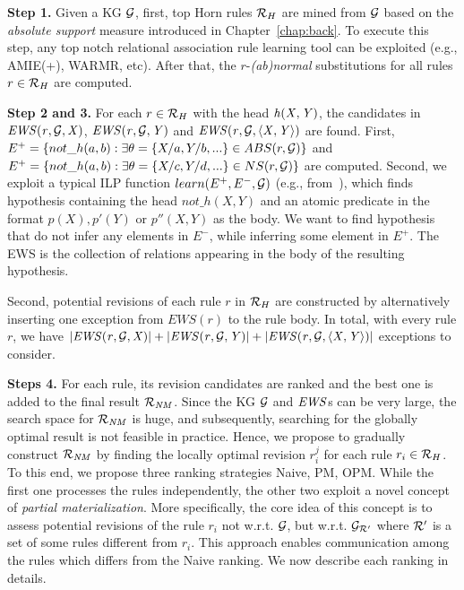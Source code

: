 \noindent \textbf{Step 1.} Given a KG $\mathcal{G}$, first, top Horn rules $\mathcal{R}_H$ are mined from $\mathcal{G}$ based on the \textit{absolute support} measure introduced in Chapter~\ref{chap:back}. To execute this step, any top notch relational association rule learning tool can be exploited (e.g., AMIE(+), WARMR, etc). After that, the $r$-\emph{(ab)normal} substitutions for all rules $r\in \mathcal{R}_H$ are computed.
\smallskip


\noindent \textbf{Step 2 and 3.} For each $r \in \mathcal{R}_H$ with the head $\mathit{h(X,Y)}$, the candidates in $\mathit{EWS(r,\mathcal{G},X)}$, $\mathit{EWS(r,\mathcal{G},Y)}$ and $\mathit{EWS(r,\mathcal{G},\langle X,Y\rangle)}$ are found. First, $E^+ = \{not\_h(a, b): \exists \theta = \{X/a, Y/b, ... \} \in ABS(r, \mathcal{G})\}$ and $E^+ = \{not\_h(a, b): \exists \theta = \{X/c, Y/d, ... \} \in NS(r, \mathcal{G})\}$ are computed. Second, we exploit a typical ILP function $learn(E^+, E^-, \mathcal{G})$ (e.g., from~\cite{ref55}), which finds hypothesis containing the head $not\_h(X, Y)$ and an atomic predicate in the format $p(X), p'(Y)$ or $p''(X, Y)$ as the body. We want to find hypothesis that do not infer any elements in $E^-$, while inferring some element in $E^+$. The EWS is the collection of relations appearing in the body of the resulting hypothesis.

Second, potential revisions of each rule $r$ in $\mathcal{R}_H$ are constructed by alternatively inserting one exception from $EWS(r)$ to the rule body. In total, with every rule $r$, we have $|\mathit{EWS(r,\mathcal{G},X)}|+|\mathit{EWS(r,\mathcal{G},Y)}|+|\mathit{EWS(r,\mathcal{G},\langle X,Y\rangle)}|$ exceptions to consider.

\smallskip

\noindent \textbf{Steps 4.} For each rule, its revision candidates are ranked and the best one is added to the final result $\mathcal{R}_{\mathit{NM}}$. Since the KG $\mathcal{G}$ and $\mathit{EWS}$s can be very large, the search space for $\mathcal{R}_{\mathit{NM}}$ is huge, and subsequently, searching for the globally optimal result is not feasible in practice. Hence, we propose to gradually construct $\mathcal{R}_{\mathit{NM}}$ by finding the locally optimal revision $r_i^{j}$ for each rule $r_i \in \mathcal{R}_{H}$. To this end, we propose three ranking strategies Naive, PM, OPM. While the first one processes the rules independently, the other two exploit a novel concept of \emph{partial materialization}. More specifically, the core idea of this concept is to assess potential revisions of the rule $r_i$ not w.r.t. $\mathcal{G}$, but w.r.t. $\mathcal{G}_{\mathcal{R}'}$ where $\mathcal{R}'$ is a set of some rules different from $r_i$. This approach enables communication among the rules which differs from the Naive ranking. We now describe each ranking in details.

